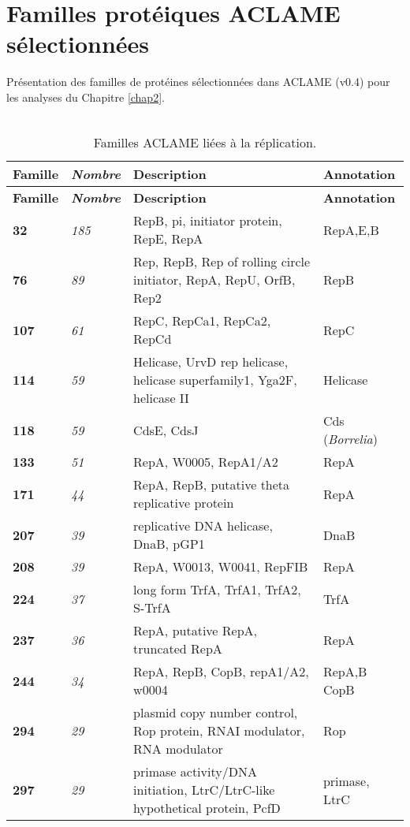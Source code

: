 \chapter{Familles protéiques ACLAME sélectionnées} 

\label{AppendiceC} 

Présentation des familles de protéines sélectionnées dans ACLAME (v0.4) pour les analyses du Chapitre \ref{chap2}.\\
\\
\begin{longtable}{ >{\bfseries\small}p{}| >{\itshape\small}p{} >{\small}p{} | >{\small}p{}}
 \caption{Familles ACLAME liées à la réplication.}\\
{\normalsize\bf Famille} & {\normalsize\bf Nombre} & {\normalsize\bf Description} & {\normalsize\bf Annotation}\\
\endfirsthead
{\normalsize\bf Famille} & {\normalsize\bf Nombre} & {\normalsize\bf Description} & {\normalsize\bf Annotation}\\
\endhead
32 & 185 & RepB, pi, initiator protein, RepE, RepA & RepA,E,B\\
76 & 89 & Rep, RepB, Rep of rolling circle initiator, RepA, RepU, OrfB, Rep2 & RepB\\
107 & 61 & RepC, RepCa1, RepCa2, RepCd & RepC\\
114 & 59 & Helicase, UrvD rep helicase, helicase superfamily1, Yga2F, helicase II & Helicase\\
118 & 59 & CdsE, CdsJ & Cds (\textit{Borrelia})\\
133 & 51 & RepA, W0005, RepA1/A2 & RepA\\
171 & 44 & RepA, RepB, putative theta replicative protein & RepA\\
207 & 39 & replicative DNA helicase, DnaB, pGP1 & DnaB\\
208 & 39 & RepA, W0013, W0041, RepFIB & RepA\\
224 & 37 & long form TrfA, TrfA1, TrfA2, S-TrfA & TrfA\\
237 & 36 & RepA, putative RepA, truncated RepA & RepA\\
244 & 34 & RepA, RepB, CopB, repA1/A2, w0004 & RepA,B CopB\\
294 & 29 & plasmid copy number control, Rop protein, RNAI modulator, RNA modulator & Rop\\
297 & 29 & primase activity/DNA initiation, LtrC/LtrC-like hypothetical protein, PcfD & primase, LtrC\\

\end{longtable}
